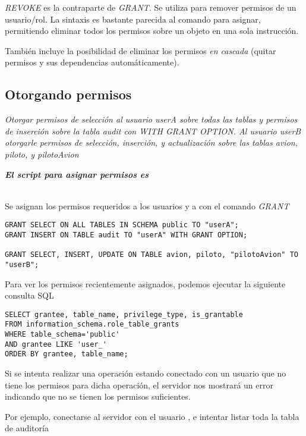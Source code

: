 \emph{REVOKE} es la contraparte de \emph{GRANT}. Se utiliza para remover permisos de un usuario/rol. La sintaxis es bastante parecida al comando para asignar, permitiendo eliminar todos los permisos sobre un objeto en una sola instrucción.

También incluye la posibilidad de eliminar los permisos \emph{en cascada} (quitar permisos y sus dependencias automáticamente).

\subsection{Otorgando permisos}
\emph{Otorgar permisos de selección al usuario userA sobre todas las tablas y permisos de inserción sobre la tabla \emph{audit} con WITH GRANT OPTION. Al usuario userB otorgarle permisos de selección, inserción, y actualización sobre las tablas \emph{avion, piloto, y pilotoAvion} } 

\emph{\textbf{El script para asignar permisos es }} 

~\\

Se asignan los permisos requeridos a los usuarios  y a  con el comando \emph{GRANT} 

\vspace*{5mm}
\lstset{style=sql}
\begin{lstlisting}
GRANT SELECT ON ALL TABLES IN SCHEMA public TO "userA";
GRANT INSERT ON TABLE audit TO "userA" WITH GRANT OPTION;

GRANT SELECT, INSERT, UPDATE ON TABLE avion, piloto, "pilotoAvion" TO "userB";
\end{lstlisting}

Para ver los permisos recientemente asignados, podemos ejecutar la siguiente consulta SQL

\vspace*{5mm}
\lstset{style=sql}
\begin{lstlisting}
SELECT grantee, table_name, privilege_type, is_grantable 
FROM information_schema.role_table_grants 
WHERE table_schema='public'
AND grantee LIKE 'user_' 
ORDER BY grantee, table_name;
\end{lstlisting}

Si se intenta realizar una operación estando conectado con un usuario que no tiene los permisos para dicha operación, el servidor nos mostrará un error indicando que no se tienen los permisos suficientes.

Por ejemplo, conectarse al servidor con el usuario , e intentar listar toda la tabla de auditoría

